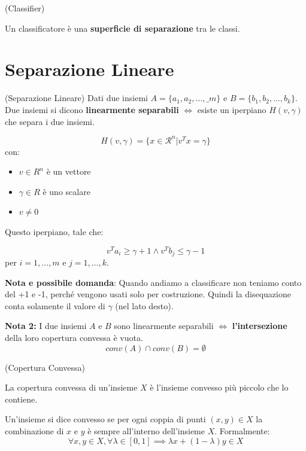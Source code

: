 \begin{definition}
    (Classifier)

    Un classificatore è una \textbf{superficie di separazione} tra le classi.
\end{definition}
\newpage
\section{Separazione Lineare}
\begin{definition}
    (Separazione Lineare)
    Dati due insiemi $A = \{a_1, a_2, \dots, \_m\}$ e $B = \{b_1, b_2, \dots, b_k\}$. Due insiemi si dicono \textbf{linearmente separabili} $\iff$ esiste un iperpiano $H(v,\gamma)$ che separa i due insiemi.

    $$
        H(v,\gamma) = \{x \in \mathcal{R}^n | v^T x = \gamma\}
    $$
    con:
    \begin{itemize}
        \item $v \in R^n$ è un vettore
        \item $\gamma \in R$ è uno scalare
        \item $v \neq 0$
    \end{itemize}

    Questo iperpiano, tale che:

    $$
        v^T a_i \geq \gamma + 1 \land v^T b_j \leq \gamma - 1
    $$
    per $i = 1, \dots, m$ e $j = 1, \dots, k$.
\end{definition}

\textbf{Nota e possibile domanda}: Quando andiamo a classificare non teniamo conto del +1 e -1, perché vengono usati solo per costruzione.
Quindi la disequazione conta solamente il valore di $\gamma$ (nel lato desto).

\textbf{Nota 2:} I due insiemi $A$ e $B$ sono linearmente separabili $\iff$ \textbf{l'intersezione} della loro copertura convessa è vuota.
$$
    conv(A) \cap conv(B) = \emptyset
$$

\begin{definition}
    (Copertura Convessa)

    La copertura convessa di un'insieme $X$ è l'insieme convesso più piccolo che lo
    contiene.

    Un'insieme si dice convesso se per ogni coppia di punti $(x,y) \in X$ la
    combinazione di $x$ e $y$ è sempre all'interno dell'insieme $X$. Formalmente:
    $$ \forall x,y \in X, \forall \lambda \in [0,1] \implies \lambda x + (1 -
        \lambda) y \in X $$
\end{definition}

